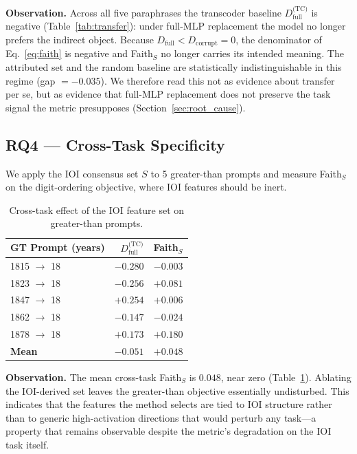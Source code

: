 \documentclass{article}
\begin{document}
\textbf{Observation.} Across all five paraphrases the transcoder baseline
$D_\text{full}^\text{(TC)}$ is negative (Table~\ref{tab:transfer}): under
full-MLP replacement the model no longer prefers the indirect object. Because
$D_\text{full} < D_\text{corrupt} = 0$, the denominator of
Eq.~\ref{eq:faith} is negative and Faith$_S$ no longer carries its intended
meaning. The attributed set and the random baseline are statistically
indistinguishable in this regime (gap $= -0.035$). We therefore read this not
as evidence about transfer per se, but as evidence that full-MLP replacement
does not preserve the task signal the metric presupposes
(Section~\ref{sec:root_cause}).

\subsection{RQ4 --- Cross-Task Specificity}

We apply the IOI consensus set $S$ to 5 greater-than prompts and measure
Faith$_S$ on the digit-ordering objective, where IOI features should be inert.

\begin{table}[h]
\centering
\caption{Cross-task effect of the IOI feature set on greater-than prompts.}
\label{tab:specificity}
\begin{tabular}{lrr}
\toprule
GT Prompt (years) & $D_\text{full}^\text{(TC)}$ & Faith$_S$ \\
\midrule
1815 $\to$ 18 & $-0.280$ & $-0.003$ \\
1823 $\to$ 18 & $-0.256$ & $+0.081$ \\
1847 $\to$ 18 & $+0.254$ & $+0.006$ \\
1862 $\to$ 18 & $-0.147$ & $-0.024$ \\
1878 $\to$ 18 & $+0.173$ & $+0.180$ \\
\midrule
\textbf{Mean}  & $-0.051$ & $\mathbf{+0.048}$ \\
\bottomrule
\end{tabular}
\end{table}

\textbf{Observation.} The mean cross-task Faith$_S$ is $0.048$, near zero
(Table~\ref{tab:specificity}). Ablating the IOI-derived set leaves the
greater-than objective essentially undisturbed. This indicates that the
features the method selects are tied to IOI structure rather than to generic
high-activation directions that would perturb any task---a property that
remains observable despite the metric's degradation on the IOI task itself.
\end{document}
